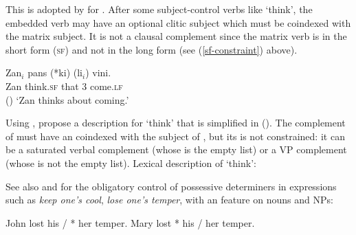 This is adopted by \citet[Section~6]{HenriandLaurens2011} for .  After some
subject-control verbs like  `think', the embedded verb may have an optional clitic
subject which must be coindexed with the matrix subject.  It is not a clausal complement since the
matrix verb is in the short form (\textsc{sf}) and not in the long form (see (\ref{sf-constraint})
above).

\ea
\gll Zan$_{i}$ pans          (*ki)           (li$_{i}$)            vini.\footnotemark\\
     Zan       think.\textsc{sf} \hphantom{(*}that \hphantom{(}3\SG{} come.\textsc{lf}  \\\hfill()
\glt `Zan thinks about coming.'
\z

\noindent
Using \xarg, \citet[]{HenriandLaurens2011} propose a description for  `think' that is
simplified in (). The complement of
 must have an \xarg coindexed with the subject of , but its \subjl is not
constrained: it can be a saturated verbal complement (whose \subjv is the empty list) or a VP
complement (whose \subjv is not the empty list).
\pagebreak
\ea
\label{ex-pans-Maritian}
Lexical description of  `think':\\
\z

\noindent
See also  and  for the obligatory control of possessive determiners in  expressions such as \emph{keep one's cool}, \emph{lose one's temper}, with an \xarg feature on nouns and NPs:
\begin{exe}
\ex \begin{xlist}
\ex John lost his / * her temper.
\ex Mary lost * his / her temper.
\end{xlist}
\end{exe}

